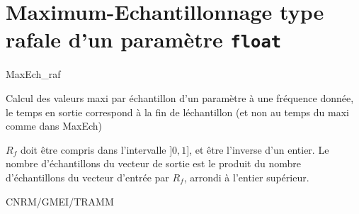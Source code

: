 %
\section{Maximum-Echantillonnage type rafale d'un param\`etre {\tt float}}

 {\sf MaxEch\_raf}

Calcul des valeurs maxi par \'echantillon d'un
param\`etre \`a une fr\'equence donn\'ee, le temps
en sortie correspond \`a la fin de l\'echantillon
(et non au temps du maxi comme dans MaxEch)

\bigskip






$R_f$ doit \^etre compris dans l'intervalle $]0, 1]$,
et \^etre l'inverse d'un entier. \newline
Le nombre d'\'echantillons du vecteur de sortie est le produit du
nombre d'\'echantillons du vecteur d'entr\'ee par $R_f$, arrondi
\`a l'entier sup\'erieur.


CNRM/GMEI/TRAMM

